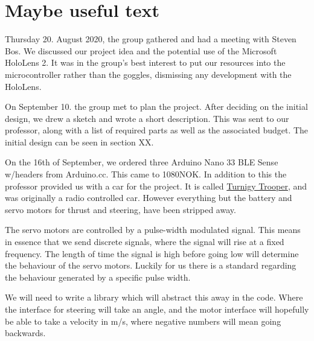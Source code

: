 \documentclass{article}
\begin{document}
\maketitle

\newpage
\tableofcontents

\newpage
\section{Maybe useful text}

Thursday 20. August 2020, the group gathered and had a meeting with Steven Bos. We discussed our project idea and the potential use of the Microsoft HoloLens 2. It was in the group's best interest to put our resources into the microcontroller rather than the goggles, dismissing any development with the HoloLens.

\vspace{5mm}
On September 10. the group met to plan the project. After deciding on the initial design, we drew a sketch and wrote a short description. This was sent to our professor, along with a list of required parts as well as the associated budget. The initial design can be seen in section XX.

\vspace{5mm}

On the 16th of September, we ordered three Arduino Nano 33 BLE Sense w/headers from Arduino.cc. This came to 1080NOK. In addition to this the professor provided us with a car for the project. It is called \href{https://hobbyking.com/en_us/turnigy-trooper-sct-4x4-1-10-brushless-short-course-truck-arr.html?___store=en_us}{Turnigy Trooper}, and was originally a radio controlled car. However everything but the battery and servo motors for thrust and steering, have been stripped away. 

The servo motors are controlled by a pulse-width modulated signal. This means in essence that we send discrete signals, where the signal will rise at a fixed frequency. The length of time the signal is high before going low will determine the behaviour of the servo motors. Luckily for us there is a standard regarding the behaviour generated by a specific pulse width. 

We will need to write a library which will abstract this away in the code. Where the interface for steering will take an angle, and the motor interface will hopefully be able to take a velocity in m/s, where negative numbers will mean going backwards.
\end{document}
